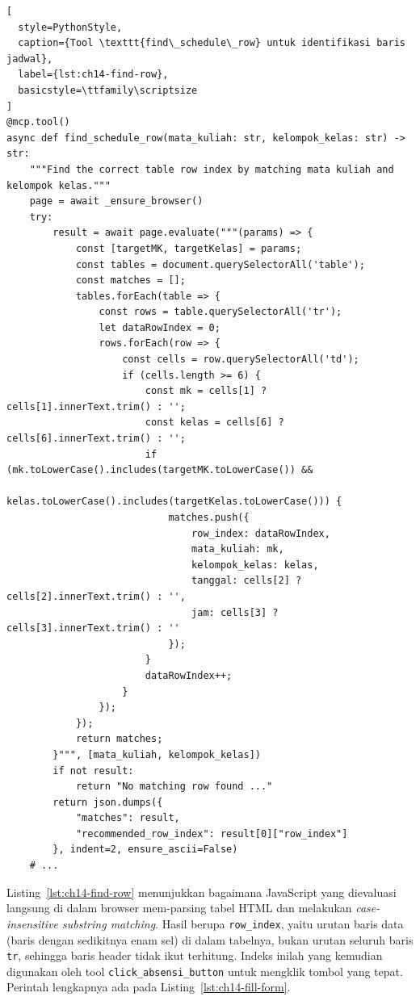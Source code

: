 \begin{lstlisting}[
  style=PythonStyle,
  caption={Tool \texttt{find\_schedule\_row} untuk identifikasi baris jadwal},
  label={lst:ch14-find-row},
  basicstyle=\ttfamily\scriptsize
]
@mcp.tool()
async def find_schedule_row(mata_kuliah: str, kelompok_kelas: str) -> str:
    """Find the correct table row index by matching mata kuliah and kelompok kelas."""
    page = await _ensure_browser()
    try:
        result = await page.evaluate("""(params) => {
            const [targetMK, targetKelas] = params;
            const tables = document.querySelectorAll('table');
            const matches = [];
            tables.forEach(table => {
                const rows = table.querySelectorAll('tr');
                let dataRowIndex = 0;
                rows.forEach(row => {
                    const cells = row.querySelectorAll('td');
                    if (cells.length >= 6) {
                        const mk = cells[1] ? cells[1].innerText.trim() : '';
                        const kelas = cells[6] ? cells[6].innerText.trim() : '';
                        if (mk.toLowerCase().includes(targetMK.toLowerCase()) &&
                            kelas.toLowerCase().includes(targetKelas.toLowerCase())) {
                            matches.push({
                                row_index: dataRowIndex,
                                mata_kuliah: mk,
                                kelompok_kelas: kelas,
                                tanggal: cells[2] ? cells[2].innerText.trim() : '',
                                jam: cells[3] ? cells[3].innerText.trim() : ''
                            });
                        }
                        dataRowIndex++;
                    }
                });
            });
            return matches;
        }""", [mata_kuliah, kelompok_kelas])
        if not result:
            return "No matching row found ..."
        return json.dumps({
            "matches": result,
            "recommended_row_index": result[0]["row_index"]
        }, indent=2, ensure_ascii=False)
    # ...
\end{lstlisting}

\noindent Listing~\ref{lst:ch14-find-row} menunjukkan bagaimana JavaScript yang dievaluasi langsung di dalam browser mem-parsing tabel HTML dan melakukan \textit{case-insensitive substring matching}. Hasil berupa \texttt{row\_index}, yaitu urutan baris data (baris dengan sedikitnya enam sel) di dalam tabelnya, bukan urutan seluruh baris \texttt{tr}, sehingga baris header tidak ikut terhitung. Indeks inilah yang kemudian digunakan oleh tool \texttt{click\_absensi\_button} untuk mengklik tombol yang tepat. Perintah lengkapnya ada pada Listing~\ref{lst:ch14-fill-form}.

